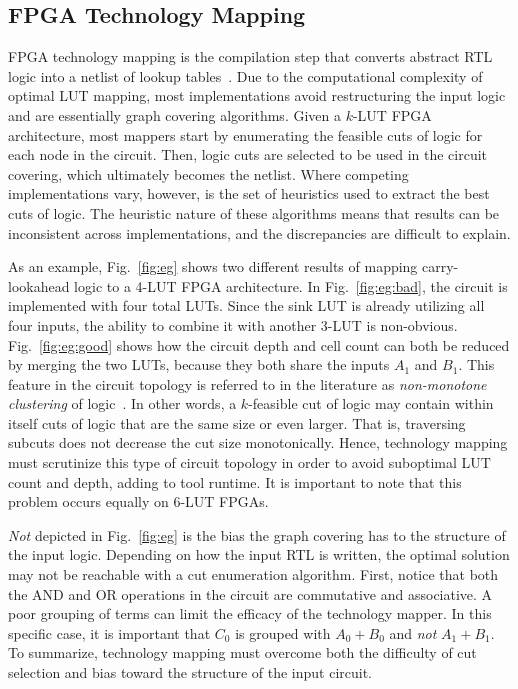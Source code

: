 \subsection{FPGA Technology Mapping}\label{sec:background:fpga}
FPGA technology mapping is the compilation step that converts abstract RTL
logic into a netlist of lookup tables~\cite{flowmap, daomap, attmap, imap,
    wiremap}. Due to the computational complexity of optimal LUT mapping, most
implementations avoid restructuring the input logic and are essentially graph
covering algorithms. Given a $k$-LUT FPGA architecture, most mappers start by
enumerating the feasible cuts of logic for each node in the circuit. Then,
logic cuts are selected to be used in the circuit covering, which ultimately
becomes the netlist. Where competing implementations vary, however, is the set
of heuristics used to extract the best cuts of logic. The heuristic nature of
these algorithms means that results can be inconsistent across implementations,
and the discrepancies are difficult to explain.

As an example, Fig.~\ref{fig:eg} shows two different results of mapping
carry-lookahead logic to a 4-LUT FPGA architecture. In Fig.~\ref{fig:eg:bad},
the circuit is implemented with four total LUTs. Since the sink LUT is already
utilizing all four inputs, the ability to combine it with another 3-LUT is
non-obvious. Fig.~\ref{fig:eg:good} shows how the circuit depth and cell count
can both be reduced by merging the two LUTs, because they both share the inputs
$A_1$ and $B_1$. This feature in the circuit topology is referred to in the
literature as \textit{non-monotone clustering} of logic~\cite{flowmap}. In
other words, a $k$-feasible cut of logic may contain within itself cuts of
logic that are the same size or even larger. That is, traversing subcuts does
not decrease the cut size monotonically. Hence, technology mapping must
scrutinize this type of circuit topology in order to avoid suboptimal LUT count
and depth, adding to tool runtime. It is important to note that this problem
occurs equally on 6-LUT FPGAs.

\textit{Not} depicted in Fig.~\ref{fig:eg} is the bias the graph
covering has to the structure of the input logic. Depending on how the input
RTL is written, the optimal solution may not be reachable with a cut
enumeration algorithm. First, notice that both the AND and OR operations in the
circuit are commutative and associative. A poor grouping of terms can limit the
efficacy of the technology mapper. In this specific case, it is important that
$C_0$ is grouped with $A_0 + B_0$ and \textit{not} $A_1 + B_1$. To summarize,
technology mapping must overcome both the difficulty of cut selection
and bias toward the structure of the input circuit.

